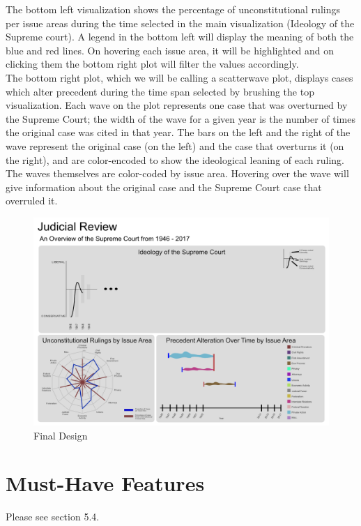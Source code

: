 \documentclass{article}
\begin{document}
The bottom left visualization shows the percentage of unconstitutional rulings per issue areas during the time selected in the main visualization (Ideology of the Supreme court). A legend in the bottom left will display the meaning of both the blue and red lines. On hovering each issue area, it will be highlighted and on clicking them the bottom right plot will filter the values accordingly.\\

The bottom right plot, which we will be calling a scatterwave plot, displays cases which alter precedent during the time span selected by brushing the top visualization.  Each wave on the plot represents one case that was overturned by the Supreme Court; the width of the wave for a given year is the number of times the original case was cited in that year.  The bars on the left and the right of the wave represent the original case (on the left) and the case that overturns it (on the right), and are color-encoded to show the ideological leaning of each ruling.  The waves themselves are color-coded by issue area.  Hovering over the wave will give information about the original case and the Supreme Court case that overruled it.
\begin{figure}[h!]
  \includegraphics[width=\linewidth]{pics/FinalDesign.png}
  \caption{Final Design}
  \label{fig:finalVis}
\end{figure}
\FloatBarrier

\section{Must-Have Features}
Please see section 5.4.
\end{document}

